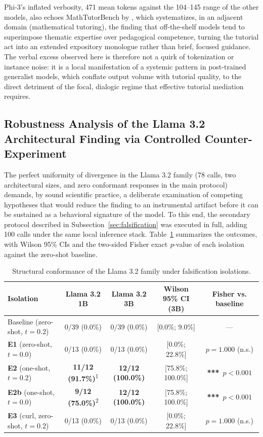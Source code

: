 \documentclass{sbc2023}%
\begin{document}
Phi-3's inflated verbosity, 471 mean tokens against the 104--145 range of the other models, also echoes MathTutorBench by \citet{macina2025mathtutorbench}, which systematizes, in an adjacent domain (mathematical tutoring), the finding that off-the-shelf models tend to superimpose thematic expertise over pedagogical competence, turning the tutorial act into an extended expository monologue rather than brief, focused guidance. The verbal excess observed here is therefore not a quirk of tokenization or instance noise: it is a local manifestation of a systemic pattern in post-trained generalist models, which conflate output volume with tutorial quality, to the direct detriment of the focal, dialogic regime that effective tutorial mediation requires.

\subsection{Robustness Analysis of the Llama 3.2 Architectural Finding via Controlled Counter-Experiment}
\label{sec:robustness}

The perfect uniformity of divergence in the Llama 3.2 family (78 calls, two architectural sizes, and zero conformant responses in the main protocol) demands, by sound scientific practice, a deliberate examination of competing hypotheses that would reduce the finding to an instrumental artifact before it can be sustained as a behavioral signature of the model. To this end, the secondary protocol described in Subsection~\ref{sec:falsification} was executed in full, adding 100 calls under the same local inference stack. Table~\ref{tab:robustness} summarizes the outcomes, with Wilson 95\% CIs and the two-sided Fisher exact \textit{p}-value of each isolation against the zero-shot baseline.

\begin{table}
\caption{Structural conformance of the Llama 3.2 family under falsification isolations.}
\centering
\begin{tabular}{@{}lcccc@{}}
\hline\hline
Isolation & Llama 3.2 1B & Llama 3.2 3B & Wilson 95\% CI (3B) & Fisher vs. baseline \\
\hline
Baseline (zero-shot, $t=0.2$) & 0/39 (0.0\%) & 0/39 (0.0\%) & [0.0\%; 9.0\%] & --- \\
\textbf{E1} (zero-shot, $t=0.0$) & 0/13 (0.0\%) & 0/13 (0.0\%) & [0.0\%; 22.8\%] & $p=1.000$ (n.s.) \\
\textbf{E2} (one-shot, $t=0.2$) & \textbf{11/12 (91.7\%)}\textsuperscript{1} & \textbf{12/12 (100.0\%)} & [75.8\%; 100.0\%] & \textbf{***}~$p<0.001$ \\
\textbf{E2b} (one-shot, $t=0.0$) & \textbf{9/12 (75.0\%)}\textsuperscript{2} & \textbf{12/12 (100.0\%)} & [75.8\%; 100.0\%] & \textbf{***}~$p<0.001$ \\
\textbf{E3} (curl, zero-shot, $t=0.2$) & 0/13 (0.0\%) & 0/13 (0.0\%) & [0.0\%; 22.8\%] & $p=1.000$ (n.s.) \\
\hline\hline
\end{tabular}
\label{tab:robustness}
\end{table}
\end{document}
